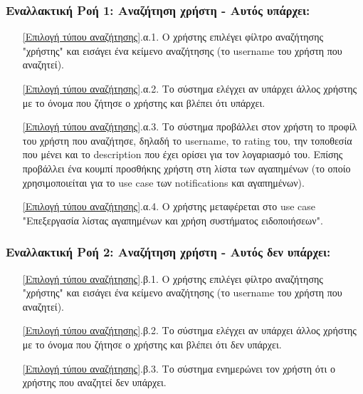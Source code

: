 \documentclass[12pt,a4paper]{article}
\begin{document}
\subsubsection*{Εναλλακτική Ροή 1: Αναζήτηση χρήστη - Αυτός υπάρχει:}
\begin{enumerate}
    \item[\ref{Επιλογή τύπου αναζήτησης}.α.1.] Ο χρήστης επιλέγει φίλτρο αναζήτησης "χρήστης" και εισάγει ένα κείμενο αναζήτησης (το username του χρήστη που αναζητεί).
    \item[\ref{Επιλογή τύπου αναζήτησης}.α.2.] Το σύστημα ελέγχει αν υπάρχει άλλος χρήστης με το όνομα που ζήτησε ο χρήστης και βλέπει ότι υπάρχει.
    \item[\ref{Επιλογή τύπου αναζήτησης}.α.3.] Το σύστημα προβάλλει στον χρήστη το προφίλ του χρήστη που αναζήτησε, δηλαδή το username, το rating του, την τοποθεσία που μένει και το description που έχει ορίσει για τον λογαριασμό του. Επίσης προβάλλει ένα κουμπί προσθήκης χρήστη στη λίστα των αγαπημένων (το οποίο χρησιμοποιείται για το use case των notifications και αγαπημένων).
    \item[\ref{Επιλογή τύπου αναζήτησης}.α.4.] Ο χρήστης μεταφέρεται στο use case "Επεξεργασία λίστας αγαπημένων και χρήση συστήματος ειδοποιήσεων".
\end{enumerate}

\subsubsection*{Εναλλακτική Ροή 2: Αναζήτηση χρήστη - Αυτός δεν υπάρχει:}
\begin{enumerate}
    \item[\ref{Επιλογή τύπου αναζήτησης}.β.1.] Ο χρήστης επιλέγει φίλτρο αναζήτησης "χρήστης" και εισάγει ένα κείμενο αναζήτησης (το username του χρήστη που αναζητεί).
    \item[\ref{Επιλογή τύπου αναζήτησης}.β.2.] Το σύστημα ελέγχει αν υπάρχει άλλος χρήστης με το όνομα που ζήτησε ο χρήστης και βλέπει ότι δεν υπάρχει.
    \item[\ref{Επιλογή τύπου αναζήτησης}.β.3.] Το σύστημα ενημερώνει τον χρήστη ότι ο χρήστης που αναζητεί δεν υπάρχει.
\end{enumerate}
\end{document}
